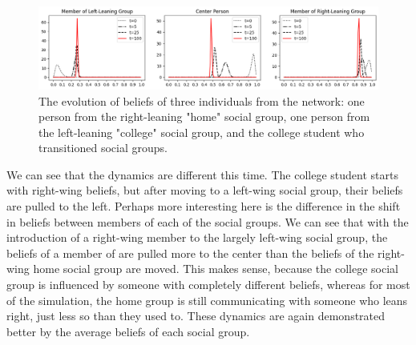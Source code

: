 \documentclass[11pt]{article}
\begin{document}
\begin{figure}[h]
    \centering
    \includegraphics[scale=0.5]{images/two_social_groups_diff_freq_individual_beliefs.png}
    \caption{The evolution of beliefs of three individuals from the network: one person from the right-leaning "home" social group, one person from the left-leaning "college" social group, and the college student who transitioned social groups.}
\end{figure}

We can see that the dynamics are different this time. The college student starts with right-wing beliefs, but after moving to a left-wing social group, their beliefs are pulled to the left. Perhaps more interesting here is the difference in the shift in beliefs between members of each of the social groups. We can see that with the introduction of a right-wing member to the largely left-wing social group, the beliefs of a member of are pulled more to the center than the beliefs of the right-wing home social group are moved. This makes sense, because the college social group is influenced by someone with completely different beliefs, whereas for most of the simulation, the home group is still communicating with someone who leans right, just less so than they used to. These dynamics are again demonstrated better by the average beliefs of each social group.
\end{document}
